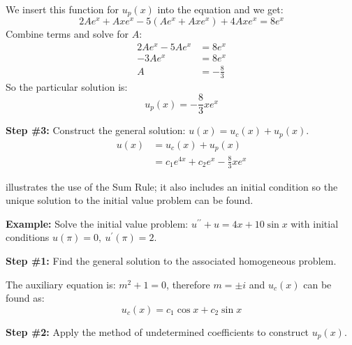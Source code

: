 \noindent We insert this function for $u_p(x)$ into the equation and we get:
\begin{equation*}
2Ae^x+Axe^x - 5(Ae^x+Axe^x) + 4Axe^x = 8e^x
\end{equation*} 
Combine terms and solve for $A$:
\begin{align*}
2Ae^x-5Ae^x &= 8e^x \\
-3Ae^x &= 8e^x \\
A &= -\frac{8}{3}
\end{align*}
So the particular solution is:
\begin{equation*}
u_p(x) = -\frac{8}{3}xe^x
\end{equation*}

\vspace{0.25cm}
\noindent\textbf{Step \#3:} Construct the general solution: $u(x)=u_c(x)+u_p(x)$.
\begin{align*}
u(x) &= u_c(x)+u_p(x) \\
&=c_1e^{4x}+c_2e^x - \frac{8}{3}xe^{x}
\end{align*}

 illustrates the use of the Sum Rule; it also includes an initial condition so the unique solution to the initial value problem can be found.

\vspace{0.25cm}

\noindent\textbf{Example:} Solve the initial value problem: $u^{\prime \prime}+u=4x+10\sin{x}$ with initial conditions $u(\pi)=0, \ u^{\prime}(\pi)=2$.

\vspace{3.25cm}

\noindent\textbf{Step \#1:} Find the general solution to the associated homogeneous problem.

\vspace{0.25cm}

\noindent The auxiliary equation is: $m^2+1=0$, therefore $m=\pm i$ and $u_c(x)$ can be found as:
\begin{equation*}
u_c(x) = c_1\cos{x}+c_2\sin{x}
\end{equation*}

\vspace{0.25cm}

\noindent\textbf{Step \#2:} Apply the method of undetermined coefficients to construct $u_p(x)$.


